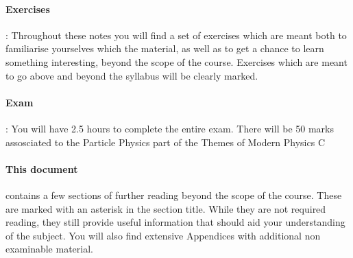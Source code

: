 \paragraph{Exercises}: Throughout these notes you will find a set of exercises which are meant both to familiarise yourselves which the material, as well as to get a chance to learn something interesting, beyond the scope of the course. Exercises which are meant to go above and beyond the syllabus will be clearly marked.


\paragraph{Exam}: You will have 2.5 hours  to complete the entire exam. There will be 50 marks assosciated to the Particle Physics part of the Themes of Modern Physics C

\paragraph{This document} contains a few sections of further reading beyond the scope of the course. These are marked with an asterisk in the section title. While they are not required reading, they still provide useful information that should aid your understanding of the subject. You will also find extensive Appendices with additional non examinable material.
